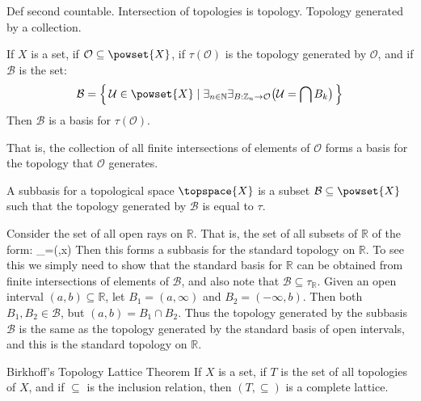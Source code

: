     Def second countable. Intersection of topologies is topology. Topology
    generated by a collection.
    \begin{theorem}
        If $X$ is a set, if $\mathcal{O}\subseteq\powset{X}$, if
        $\tau(\mathcal{O})$ is the topology generated by $\mathcal{O}$,
        and if $\mathcal{B}$ is the set:
        \begin{equation}
            \mathcal{B}=\Big\{\,\mathcal{U}\in\powset{X}\;|\;
                \exists_{n\in\mathbb{N}}
                \exists_{B:\mathbb{Z}_{n}\rightarrow\mathcal{O}}
                \big(\mathcal{U}=\bigcap{B}_{k}\big)\,\Big\}
        \end{equation}
        Then $\mathcal{B}$ is a basis for $\tau(\mathcal{O})$.
    \end{theorem}
    That is, the collection of all finite intersections of elements of
    $\mathcal{O}$ forms a basis for the topology that $\mathcal{O}$
    generates.
    \begin{definition}
        A subbasis for a topological space $\topspace{X}$ is a subset
        $\mathcal{B}\subseteq\powset{X}$ such that the topology generated
        by $\mathcal{B}$ is equal to $\tau$.
    \end{definition}
    \begin{example}
        Consider the set of all open rays on $\mathbb{R}$. That is, the set
        of all subsets of $\mathbb{R}$ of the form:
                    {_{\minus}=(\minus\infty,x)}
        Then this forms a subbasis for the standard topology on
        $\mathbb{R}$. To see this we simply need to show that the standard
        basis for $\mathbb{R}$ can be obtained from finite intersections of
        elements of $\mathcal{B}$, and also note that
        $\mathcal{B}\subseteq\tau_{\mathbb{R}}$. Given an open interval
        $(a,b)\subseteq\mathbb{R}$, let $B_{1}=(a,\infty)$ and
        $B_{2}=(\minus\infty,b)$. Then both $B_{1},B_{2}\in\mathcal{B}$,
        but $(a,b)=B_{1}\cap{B}_{2}$. Thus the topology generated by the
        subbasis $\mathcal{B}$ is the same as the topology generated by the
        standard basis of open intervals, and this is the standard
        topology on $\mathbb{R}$.
    \end{example}
    \begin{ltheorem}{Birkhoff's Topology Lattice Theorem}
        If $X$ is a set, if $T$ is the set of all topologies of $X$, and if
        $\subseteq$ is the inclusion relation, then $(T,\subseteq)$ is a
        complete lattice.
    \end{ltheorem}

